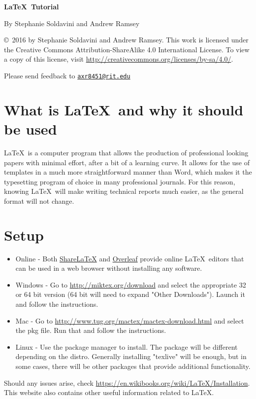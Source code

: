 \documentclass[11pt]{article}
\begin{document}
\vspace*{2.5cm} 

\begin{center}
    \LARGE
    \textbf{\LaTeX\ Tutorial}\\ 

    \medskip

    \large
    By Stephanie Soldavini and Andrew Ramsey 
\end{center}
\vfill

\copyright\ 2016 by Stephanie Soldavini and Andrew Ramsey. This work is licensed under the Creative Commons Attribution-ShareAlike 4.0 International License. To view a copy of this license, visit \url{http://creativecommons.org/licenses/by-sa/4.0/}.

Please send feedback to \href{mailto:axr8451@rit.edu}{\nolinkurl{axr8451@rit.edu}}

\newpage


\section*{What is \LaTeX\ and why it should be used}
\LaTeX\ is a computer program that allows the production of professional looking papers with minimal effort, after a bit of a learning curve. It allows for the use of templates in a much more straightforward manner than Word, which makes it the typesetting program of choice in many professional journals. For this reason, knowing \LaTeX\ will make writing technical reports much easier, as the general format will not change.


\section*{Setup}
\begin{itemize} 
        \item Online - Both \href{https://www.sharelatex.com/}{ShareLaTeX} and \href{https://www.overleaf.com/}{Overleaf} provide online \LaTeX\ editors that can be used in a web browser without installing any software.
    \item Windows - Go to \url{http://miktex.org/download} and select the appropriate 32 or 64 bit version (64 bit will need to expand "Other Downloads"). Launch it and follow the instructions.

    \item Mac - Go to \url{http://www.tug.org/mactex/mactex-download.html} and select the pkg file. Run that and follow the instructions. 

    \item Linux - Use the package manager to install. The package will be different depending on the distro. Generally installing "texlive" will be enough, but in some cases, there will be other packages that provide additional functionality. 
\end{itemize}
        Should any issues arise, check \url{https://en.wikibooks.org/wiki/LaTeX/Installation}. This website also contains other useful information related to \LaTeX.
\end{document}
